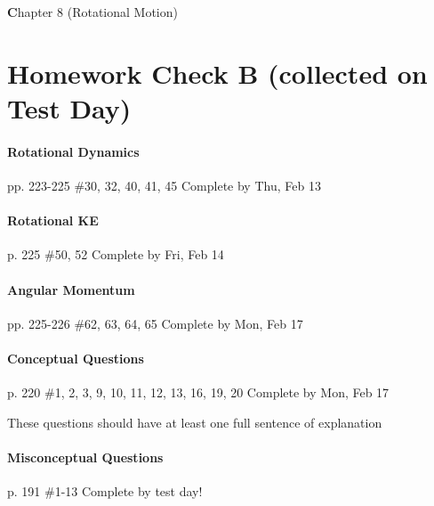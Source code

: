 \documentclass[10pt]{exam}
\def\mytitle{Chapter 8 (Rotational Motion)}
\def\mymaketitle{
  \begin{flushleft}
    {\LARGE \textbf \mytitle \par}
  \end{flushleft}
}
\begin{document}
\vspace{1em}




\pagebreak

\mymaketitle

\section*{Homework Check B (collected on Test Day)}



\paragraph{Rotational Dynamics} pp. 223-225 \#30, 32, 40, 41, 45
\dotfill Complete by Thu, Feb 13






\paragraph{Rotational KE} p. 225 \#50, 52
\dotfill Complete by Fri, Feb 14





\paragraph{Angular Momentum} pp. 225-226 \#62, 63, 64, 65
\dotfill Complete by Mon, Feb 17





\paragraph{Conceptual Questions} p. 220 \#1, 2, 3, 9, 10, 11, 12, 13, 16, 19, 20
\dotfill Complete by Mon, Feb 17
   
{\sc These questions should have at least one full sentence 
      of explanation}



\paragraph{Misconceptual Questions} p. 191 \#1-13
\dotfill Complete by test day!
   
\end{document}
